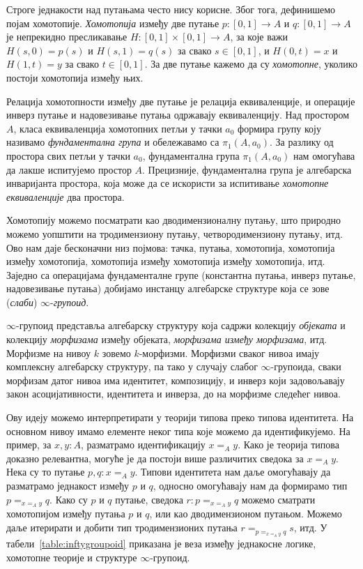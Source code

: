 \documentclass[12pt,oneside]{memoir}
\begin{document}
Строге једнакости над путањама често нису корисне. Због тога, дефинишемо појам хомотопије. \emph{Хомотопија} између две путање $p : [0, 1] \to A$ и $q : [0, 1] \to A$ је непрекидно пресликавање $H : [0, 1] \times [0, 1] \to A$, за које важи $H(s, 0) = p(s)$ и $H(s, 1) = q(s)$ за свако $s \in [0, 1]$, и
$H(0, t) = x$ и $H(1, t) = y$ за свако $t \in [0, 1]$. За две путање кажемо да су \emph{хомотопне}, уколико постоји хомотопија између њих.

Релација хомотопности између две путање је релација еквиваленције, и операције инверз путање и надовезивање путања одржавају еквиваленцију. Над простором $A$, класа еквиваленција хомотопних петљи у тачки $a_0$ формира групу коју називамо \emph{фундаментална група} и обележавамо са $\pi_1(A, a_0)$. За разлику од простора свих петљи у тачки $a_0$, фундаментална група $\pi_1(A, a_0)$ нам омогућава да лакше испитујемо простор $A$. Прецизније, фундаментална група је алгебарска инваријанта
простора, која може да се искористи за испитивање \emph{хомотопне еквиваленције} два простора.

Хомотопију можемо посматрати као дводимензионалну путању, што природно можемо уопштити на тродимензиону путању, четвородимензиону путању, итд. Ово нам даје бесконачни низ појмова: тачка, путања, хомотопија, хомотопија између хомотопија, хомотопија између хомотопија између хомотопија, итд. Заједно са операцијама фундаменталне групе (константна путања, инверз путање, надовезивање путања) добијамо инстанцу алгебарске структуре која се зове (\emph{слаби}) $\infty$-\emph{групоид}.

$\infty$-групоид представља алгебарску структуру која садржи колекцију \emph{објеката} и колекцију \emph{морфизама} између објеката, \emph{морфизама између морфизама}, итд. Морфизме на нивоу $k$ зовемо $k$-морфизми. Морфизми сваког нивоа имају комплексну алгебарску структуру, па тако у случају слабог $\infty$-групоида, сваки морфизам датог нивоа има идентитет, композицију, и инверз који задовољавају закон асоцијативности, идентитета и инверза, до на морфизме следећег нивоа.

Ову идеју можемо интерпретирати у теорији типова преко типова идентитета. На основном нивоу имамо елементе неког типа које можемо да идентификујемо. На пример, за $x, y : A$, разматрамо идентификацију $x =_A y$. Како је теорија типова доказно релевантна, могуће је да постоји више различитих сведока за $x =_A y$. Нека су то путање $p, q : x =_A y$. Типови идентитета нам даље омогућавају да разматрамо једнакост између $p$ и $q$, односно омогућавају нам да формирамо тип $p =_{x =_A y} q$. Како су $p$ и $q$ путање, сведока $r : p =_{x =_A y} q$ можемо сматрати хомотопијом између путања $p$ и $q$, или као дводимензионом путањом. Можемо даље итерирати и добити тип тродимензионих путања $r =_{p =_{x =_A y} q} s$, итд. У табели~\ref{table:inftygroupoid} приказана је веза између једнакосне логике, хомотопне теорије и структуре $\infty$-групоид.
\end{document}
